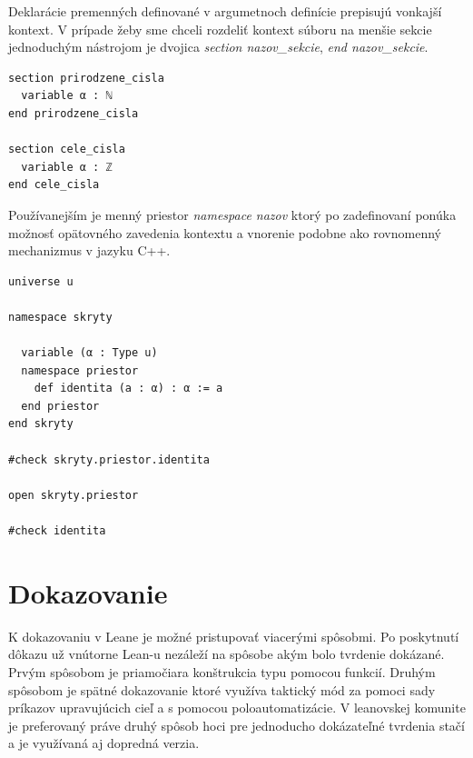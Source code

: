 \documentclass[a4paper,10pt,oneside]{report}%
\begin{document}
    Deklarácie premenných definované v argumetnoch definície prepisujú vonkajší kontext.
    V prípade žeby sme chceli rozdeliť kontext súboru na menšie sekcie jednoduchým
nástrojom je dvojica \emph{section nazov\_sekcie}, \emph{end nazov\_sekcie}.
\begin{lstlisting}
section prirodzene_cisla
  variable α : ℕ
end prirodzene_cisla

section cele_cisla
  variable α : ℤ
end cele_cisla
\end{lstlisting}
    Používanejším je menný priestor \emph{namespace nazov} ktorý po zadefinovaní ponúka
možnosť opätovného zavedenia kontextu a vnorenie podobne ako rovnomenný mechanizmus
v jazyku C++.
\begin{lstlisting}
universe u

namespace skryty

  variable (α : Type u)
  namespace priestor
    def identita (a : α) : α := a
  end priestor
end skryty

#check skryty.priestor.identita

open skryty.priestor

#check identita
\end{lstlisting}
\section{Dokazovanie}

    K dokazovaniu v Leane je možné pristupovať viacerými spôsobmi.
    Po poskytnutí dôkazu už vnútorne Lean-u nezáleží na spôsobe akým bolo tvrdenie
dokázané.
    Prvým spôsobom je priamočiara konštrukcia typu pomocou funkcií.
    Druhým spôsobom je spätné dokazovanie ktoré využíva taktický mód za pomoci
sady príkazov upravujúcich cieľ a s pomocou poloautomatizácie.
    V leanovskej komunite je preferovaný práve druhý spôsob hoci pre jednoducho
dokázateľné tvrdenia stačí a je využívaná aj dopredná verzia.
\end{document}
